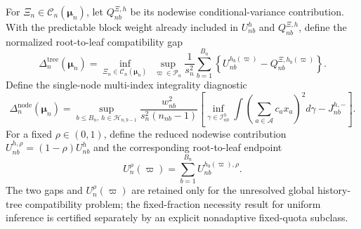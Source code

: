 For \(\Xi_n\in\mathcal C_n(\boldsymbol\mu_n)\), let \(Q_{nb}^{\Xi,h}\) be its nodewise conditional-variance contribution. With the predictable block weight already included in \(U_{nb}^{h}\) and \(Q_{nb}^{\Xi,h}\), define the normalized root-to-leaf compatibility gap
\[
\Delta_n^{\mathrm{tree}}(\boldsymbol\mu_n)=\inf_{\Xi_n\in\mathcal C_n(\boldsymbol\mu_n)}\ \sup_{\varpi\in\mathcal P_n}\frac1{s_n^2}\sum_{b=1}^{B_n}\left\{U_{nb}^{h_b(\varpi)}-Q_{nb}^{\Xi,h_b(\varpi)}\right\}.
\]
Define the single-node multi-index integrality diagnostic
\[
\Delta_n^{\mathrm{node}}(\boldsymbol\mu_n)=\sup_{b\le B_n,\,h\in\mathcal H_{n,b-1}}\frac{w_{nb}^2}{s_n^2(n_{nb}-1)}\left[\inf_{\gamma\in\mathcal I_{nb}^{h}}\int\left(\sum_{a\in\mathcal A}c_ax_a\right)^2d\gamma-J_{nb}^{h,-}\right].
\]
For a fixed \(\rho\in(0,1)\), define the reduced nodewise contribution \(U_{nb}^{h,\rho}=(1-\rho)U_{nb}^{h}\) and the corresponding root-to-leaf endpoint
\[
U_n^{\rho}(\varpi)=\sum_{b=1}^{B_n}U_{nb}^{h_b(\varpi),\rho}.
\]
The two gaps and \(U_n^{\rho}(\varpi)\) are retained only for the unresolved global history-tree compatibility problem; the fixed-fraction necessity result for uniform inference is certified separately by an explicit nonadaptive fixed-quota subclass.